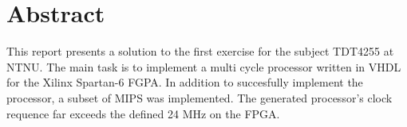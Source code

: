 \section*{Abstract}
\label{sec:abstract}

\vspace*{\fill}
This report presents a solution to the first exercise for the subject TDT4255 at NTNU.
The main task is to implement a multi cycle processor written in VHDL for the Xilinx Spartan-6 FGPA.
In addition to succesfully implement the processor, a subset of MIPS was implemented.
The generated processor's clock requence far exceeds the defined 24 MHz on the FPGA.
\vspace*{\fill}
